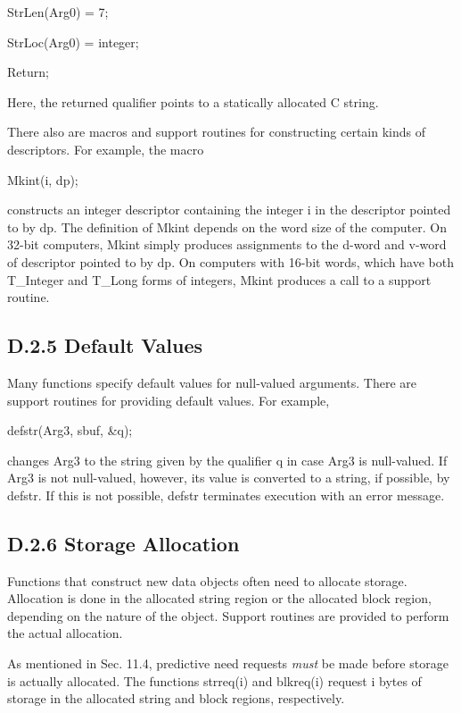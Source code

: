 {\ttfamily\mdseries
StrLen(Arg0) = 7;}

{\ttfamily\mdseries
StrLoc(Arg0) = {\textquotedbl}integer{\textquotedbl};}

{\ttfamily\mdseries
Return;}

Here, the returned qualifier points to a statically allocated C string.

There also are macros and support routines for constructing certain
kinds of descriptors. For example, the macro

{\ttfamily\mdseries
Mkint(i, dp);}

constructs an integer descriptor containing the integer i in the
descriptor pointed to by dp. The definition of Mkint depends on the
word size of the computer. On 32-bit computers, Mkint simply produces
assignments to the d-word and v-word of descriptor pointed to by
dp. On computers with 16-bit words, which have both T\_Integer and
T\_Long forms of integers, Mkint produces a call to a support routine.

\subsection{D.2.5 Default Values}

Many functions specify default values for null-valued arguments. There
are support routines for providing default values. For example,

{\ttfamily\mdseries
defstr(Arg3, sbuf, \&q);}

\noindent changes Arg3 to the string given by the qualifier q in case
Arg3 is null-valued. If Arg3 is not null-valued, however, its value is
converted to a string, if possible, by defstr. If this is not
possible, defstr terminates execution with an error message.

\subsection{D.2.6 Storage Allocation}

Functions that construct new data objects often need to allocate
storage. Allocation is done in the allocated string region or the
allocated block region, depending on the nature of the object. Support
routines are provided to perform the actual allocation.

As mentioned in Sec. 11.4, predictive need requests \textit{must} be
made before storage is actually allocated. The functions strreq(i) and
blkreq(i) request i bytes of storage in the allocated string and block
regions, respectively.

